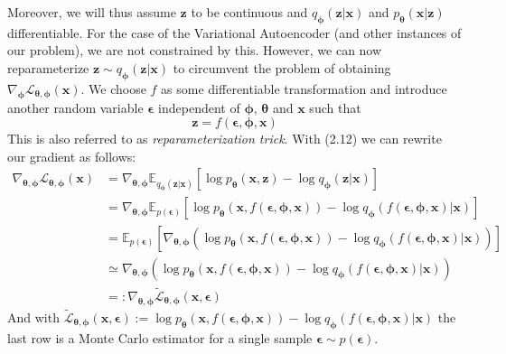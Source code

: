 \documentclass[12pt]{report}
\theoremstyle{definition}
\begin{document}
Moreover, we will thus assume $\mathbf{z}$ to be continuous and $q_{\mathbf{\phi}}(\mathbf{z}|\mathbf{x})$ and $p_{\mathbf{\theta}}(\mathbf{x}|\mathbf{z})$ differentiable. For the case of the Variational Autoencoder (and other instances of our problem), we are not constrained by this. However, we can now reparameterize $\mathbf{z} \sim q_{\mathbf{\phi}}(\mathbf{z}|\mathbf{x})$ to circumvent the problem of obtaining $\nabla_{\pmb{\phi}}\mathcal{L}_{\pmb{\theta}, \pmb{\phi}}(\mathbf{x})$. We choose $f$ as some differentiable transformation and introduce another random variable $\pmb{\epsilon}$ independent of $\pmb{\phi}$, $\pmb{\theta}$ and $\mathbf{x}$ such that
\begin{equation}
\mathbf{z} = f(\pmb{\epsilon}, \pmb{\phi}, \mathbf{x})
\end{equation}
This is also referred to as \emph{reparameterization trick}. With (2.12) we can rewrite our gradient as follows:
\begin{equation}
\begin{split}
\nabla_{\pmb{\theta}, \pmb{\phi}}\mathcal{L}_{\pmb{\theta}, \pmb{\phi}}(\mathbf{x}) 
& = \nabla_{\pmb{\theta}, \pmb{\phi}} \mathbb{E}_{q_{\mathbf{\phi}}(\mathbf{z}|\mathbf{x})}\left[ \log p_{\mathbf{\theta}}(\mathbf{x}, \mathbf{z}) - \log q_{\mathbf{\phi}}(\mathbf{z}|\mathbf{x}) \right]	\\
& = \nabla_{\pmb{\theta}, \pmb{\phi}} \mathbb{E}_{p(\pmb{\epsilon})}\left[ \log p_{\mathbf{\theta}}(\mathbf{x}, f(\pmb{\epsilon}, \pmb{\phi}, \mathbf{x})) - \log q_{\mathbf{\phi}}(f(\pmb{\epsilon}, \pmb{\phi}, \mathbf{x})|\mathbf{x}) \right]	\\
& = \mathbb{E}_{p(\pmb{\epsilon})}\left[ \nabla_{\pmb{\theta}, \pmb{\phi}}(\log p_{\mathbf{\theta}}(\mathbf{x}, f(\pmb{\epsilon}, \pmb{\phi}, \mathbf{x})) - \log q_{\mathbf{\phi}}(f(\pmb{\epsilon}, \pmb{\phi}, \mathbf{x})|\mathbf{x})) \right]	\\
& \simeq \nabla_{\pmb{\theta}, \pmb{\phi}}(\log p_{\mathbf{\theta}}(\mathbf{x}, f(\pmb{\epsilon}, \pmb{\phi}, \mathbf{x})) - \log q_{\mathbf{\phi}}(f(\pmb{\epsilon}, \pmb{\phi}, \mathbf{x})|\mathbf{x})) \\
& =: \nabla_{\pmb{\theta}, \pmb{\phi}}\tilde{\mathcal{L}}_{\pmb{\theta}, \pmb{\phi}}(\mathbf{x}, \pmb{\epsilon})
\end{split}
\end{equation}
And with $\tilde{\mathcal{L}}_{\pmb{\theta}, \pmb{\phi}}(\mathbf{x}, \pmb{\epsilon}) := \log p_{\mathbf{\theta}}(\mathbf{x}, f(\pmb{\epsilon}, \pmb{\phi}, \mathbf{x})) - \log q_{\mathbf{\phi}}(f(\pmb{\epsilon}, \pmb{\phi}, \mathbf{x})|\mathbf{x})$ the last row is a Monte Carlo estimator for a single sample $\pmb{\epsilon} \sim p(\pmb{\epsilon})$. 
\end{document}
